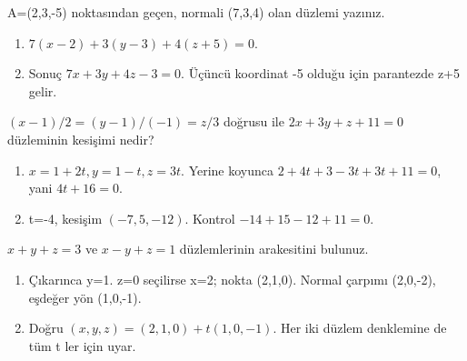 \begin{tcolorbox}[title={Örnek 2.12 | Aynı yöntemin ikinci örneği},colframe=accent]A=(2,3,-5) noktasından geçen, normali (7,3,4) olan düzlemi yazınız.
\par{}\end{tcolorbox}
\begin{tcolorbox}[title={Adım adım çözüm},colback=green!3!white,colframe=green]\begin{enumerate}
\item \(7(x-2)+3(y-3)+4(z+5)=0\).
\item Sonuç \(7x+3y+4z-3=0\). Üçüncü koordinat -5 olduğu için parantezde z+5 gelir.
\end{enumerate}\end{tcolorbox}
\begin{tcolorbox}[title={Örnek 2.13 | Tahtadaki ikinci kesişim örneği},colframe=accent]\((x-1)/2=(y-1)/(-1)=z/3\) doğrusu ile \(2x+3y+z+11=0\) düzleminin kesişimi nedir?
\par{}\end{tcolorbox}
\begin{tcolorbox}[title={Adım adım çözüm},colback=green!3!white,colframe=green]\begin{enumerate}
\item \(x=1+2t,y=1-t,z=3t\). Yerine koyunca \(2+4t+3-3t+3t+11=0\), yani \(4t+16=0\).
\item t=-4, kesişim \((-7,5,-12)\). Kontrol \(-14+15-12+11=0\).
\end{enumerate}\end{tcolorbox}
\begin{tcolorbox}[title={Örnek 2.14 | İki düzlemin arakesiti: tahta örneği},colframe=accent]\(x+y+z=3\) ve \(x-y+z=1\) düzlemlerinin arakesitini bulunuz.
\par{}\end{tcolorbox}
\begin{tcolorbox}[title={Adım adım çözüm},colback=green!3!white,colframe=green]\begin{enumerate}
\item Çıkarınca y=1. z=0 seçilirse x=2; nokta (2,1,0). Normal çarpımı (2,0,-2), eşdeğer yön (1,0,-1).
\item Doğru \((x,y,z)=(2,1,0)+t(1,0,-1)\). Her iki düzlem denklemine de tüm t ler için uyar.
\end{enumerate}\end{tcolorbox}
